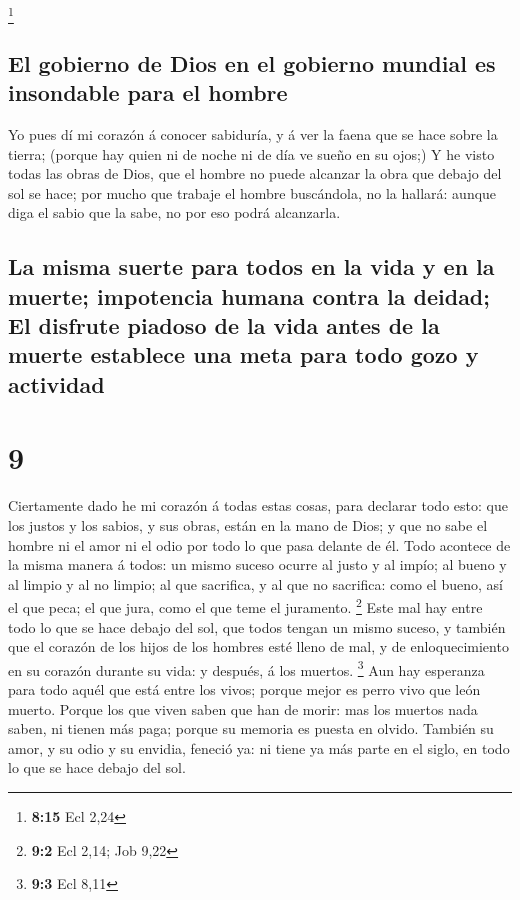\footnote{\textbf{8:15} Ecl 2,24}

\hypertarget{el-gobierno-de-dios-en-el-gobierno-mundial-es-insondable-para-el-hombre}{%
\subsection{El gobierno de Dios en el gobierno mundial es insondable
para el
hombre}\label{el-gobierno-de-dios-en-el-gobierno-mundial-es-insondable-para-el-hombre}}

 Yo pues dí mi corazón á conocer sabiduría, y á ver la
faena que se hace sobre la tierra; (porque hay quien ni de noche ni de
día ve sueño en su ojos;)  Y he visto todas las obras de
Dios, que el hombre no puede alcanzar la obra que debajo del sol se
hace; por mucho que trabaje el hombre buscándola, no la hallará: aunque
diga el sabio que la sabe, no por eso podrá alcanzarla.

\hypertarget{la-misma-suerte-para-todos-en-la-vida-y-en-la-muerte-impotencia-humana-contra-la-deidad-el-disfrute-piadoso-de-la-vida-antes-de-la-muerte-establece-una-meta-para-todo-gozo-y-actividad}{%
\subsection{La misma suerte para todos en la vida y en la muerte;
impotencia humana contra la deidad; El disfrute piadoso de la vida antes
de la muerte establece una meta para todo gozo y
actividad}\label{la-misma-suerte-para-todos-en-la-vida-y-en-la-muerte-impotencia-humana-contra-la-deidad-el-disfrute-piadoso-de-la-vida-antes-de-la-muerte-establece-una-meta-para-todo-gozo-y-actividad}}

\hypertarget{section-8}{%
\section{9}\label{section-8}}

 Ciertamente dado he mi corazón á todas estas cosas, para
declarar todo esto: que los justos y los sabios, y sus obras, están en
la mano de Dios; y que no sabe el hombre ni el amor ni el odio por todo
lo que pasa delante de él.  Todo acontece de la misma manera
á todos: un mismo suceso ocurre al justo y al impío; al bueno y al
limpio y al no limpio; al que sacrifica, y al que no sacrifica: como el
bueno, así el que peca; el que jura, como el que teme el juramento.
\footnote{\textbf{9:2} Ecl 2,14; Job 9,22}  Este mal hay
entre todo lo que se hace debajo del sol, que todos tengan un mismo
suceso, y también que el corazón de los hijos de los hombres esté lleno
de mal, y de enloquecimiento en su corazón durante su vida: y después, á
los muertos. \footnote{\textbf{9:3} Ecl 8,11}  Aun hay
esperanza para todo aquél que está entre los vivos; porque mejor es
perro vivo que león muerto.  Porque los que viven saben que
han de morir: mas los muertos nada saben, ni tienen más paga; porque su
memoria es puesta en olvido.  También su amor, y su odio y
su envidia, feneció ya: ni tiene ya más parte en el siglo, en todo lo
que se hace debajo del sol.

